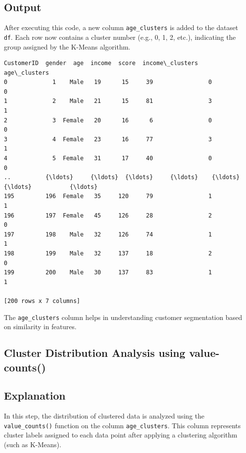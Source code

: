 \documentclass[11pt,a4paper]{report}
\makeatletter
\newcommand{\boxspacing}{\kern\kvtcb@left@rule\kern\kvtcb@boxsep}
\newcommand{\prompt}[4]{
        {\ttfamily\llap{{\color{#2}[#3]:\hspace{3pt}#4}}\vspace{-\baselineskip}}
    }
\makeatother
\begin{document}
\subsection*{Output}
After executing this code, a new column \texttt{age\_clusters} is added to the dataset \texttt{df}. Each row now contains a cluster number (e.g., 0, 1, 2, etc.), indicating the group assigned by the K-Means algorithm.


\begin{tcolorbox}[breakable, size=fbox, boxrule=.5pt, pad at break*=1mm, opacityfill=0]
\prompt{Out}{outcolor}{24}{\boxspacing}
\begin{Verbatim}[commandchars=\\\{\}]
     CustomerID  gender  age  income  score  income\_clusters  age\_clusters
0             1    Male   19      15     39                0             0
1             2    Male   21      15     81                3             1
2             3  Female   20      16      6                0             0
3             4  Female   23      16     77                3             1
4             5  Female   31      17     40                0             0
..          {\ldots}     {\ldots}  {\ldots}     {\ldots}    {\ldots}              {\ldots}           {\ldots}
195         196  Female   35     120     79                1             1
196         197  Female   45     126     28                2             0
197         198    Male   32     126     74                1             1
198         199    Male   32     137     18                2             0
199         200    Male   30     137     83                1             1

[200 rows x 7 columns]
\end{Verbatim}
\end{tcolorbox}
The \texttt{age\_clusters} column helps in understanding customer segmentation based on similarity in features.

\subsection{Cluster Distribution Analysis using value-counts()}

\subsection*{Explanation}
In this step, the distribution of clustered data is analyzed using the \texttt{value\_counts()} function on the column \texttt{age\_clusters}. This column represents cluster labels assigned to each data point after applying a clustering algorithm (such as K-Means).
\end{document}
